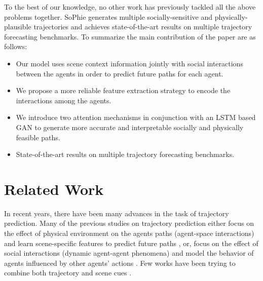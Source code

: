 \documentclass[10pt,twocolumn,letterpaper]{article}
\begin{document}
To the best of our knowledge, no other work has previously tackled all the above problems together. SoPhie generates multiple socially-sensitive and physically-plausible trajectories and achieves state-of-the-art results on multiple trajectory forecasting benchmarks. To summarize the main contribution of the paper are as follows:
\begin{itemize}[leftmargin=*]
\item Our model uses scene context information jointly with social interactions between the agents in order to predict future paths for each agent.
\item We propose a more reliable feature extraction strategy to encode the interactions among the agents.
\item We introduce two attention mechanisms in conjunction with an LSTM based GAN to generate more accurate and interpretable socially and physically feasible paths. 
\item State-of-the-art results on multiple trajectory forecasting benchmarks.
\end{itemize}





\section{Related Work}
\label{sec:Related_Work}

In recent years, there have been many advances in the task of trajectory prediction. Many of the previous studies on trajectory prediction either focus on the effect of physical environment on the agents paths (agent-space interactions) and learn scene-specific features to predict future paths \cite{sadeghian2017car}, or, focus on the effect of social interactions (dynamic agent-agent phenomena) and model the behavior of agents influenced by other agents' actions \cite{alahi2016social,gupta2018social}.
Few works have been trying to combine both trajectory and scene cues \cite{lee2017desire}.
\end{document}
